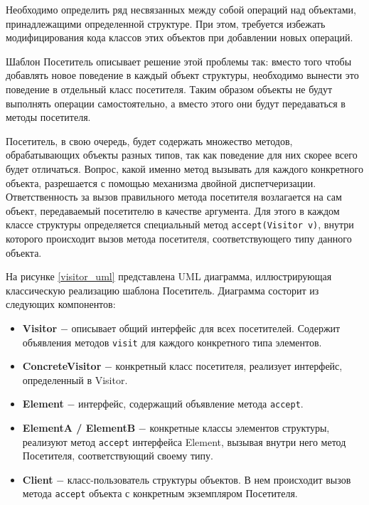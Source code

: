 \documentclass[14pt, a4paper]{article}
\def\code#1{\texttt{#1}} %
\begin{document}
Необходимо определить ряд несвязанных между собой операций над объектами, принадлежащими определенной структуре.
При этом, требуется избежать модифицирования кода классов этих объектов при добавлении новых операций. 

Шаблон Посетитель описывает решение этой проблемы так:
вместо того чтобы добавлять новое поведение в каждый объект структуры, необходимо вынести это поведение 
в отдельный класс посетителя. Таким образом объекты не будут выполнять операции самостоятельно, а вместо этого 
они будут передаваться в методы посетителя.

Посетитель, в свою очередь, будет содержать множество методов, обрабатывающих объекты разных типов, так как
поведение для них скорее всего будет отличаться. Вопрос, какой именно метод вызывать для каждого конкретного объекта,
разрешается с помощью механизма двойной диспетчеризации. Ответственность за вызов правильного метода посетителя
возлагается на сам объект, передаваемый посетителю в качестве аргумента. Для этого в каждом классе структуры
определяется специальный метод \code{accept(Visitor v)}, внутри которого происходит вызов метода посетителя, соответствующего
типу данного объекта.

На рисунке \ref{visitor_uml} представлена UML диаграмма, иллюстрирующая классическую реализацию шаблона
Посетитель. Диаграмма состорит из следующих компонентов:
\begin{itemize}
  \item \textbf{Visitor} $-$ описывает общий интерфейс для всех посетителей. Содержит объявления 
    методов \code{visit} для каждого конкретного типа элементов. 
  \item \textbf{ConcreteVisitor} $-$ конкретный класс посетителя, реализует интерфейс, определенный в Visitor.
  \item \textbf{Element} $-$ интерфейс, содержащий объявление метода \code{accept}.
  \item \textbf{ElementA / ElementB} $-$ конкретные классы элементов структуры, реализуют метод \code{accept}
    интерфейса Element, вызывая внутри него метод Посетителя, соответствующий своему типу.
  \item \textbf{Client} $-$ класс-пользователь структуры объектов. В нем происходит вызов метода \code{accept}
    объекта с конкретным экземпляром Посетителя.
\end{itemize}
\end{document}
